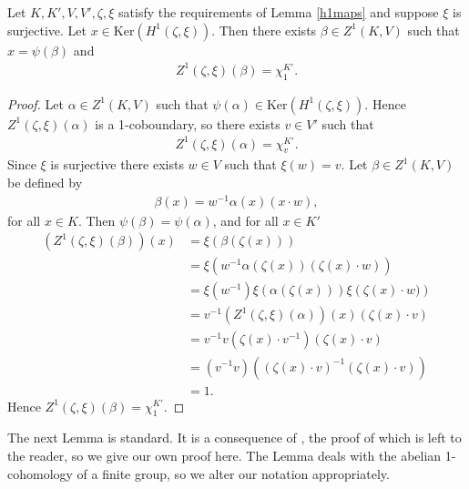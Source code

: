 \begin{lemma}\label{kerh1} Let $K, K', V, V', \zeta, \xi$ satisfy the requirements of Lemma \ref{h1maps} and suppose $\xi$ is surjective. 
Let $x\in \mathrm{Ker}\left(H^1(\zeta, \xi)\right)$. Then there exists $\beta \in Z^1(K, V)$ such that $x = \psi(\beta)$ and
\begin{align*}
	Z^1(\zeta, \xi)(\beta) = \chi^{K'}_1.
\end{align*}
\end{lemma}
\begin{proof}
	Let $\alpha \in Z^1(K, V)$ such that $\psi(\alpha) \in \mathrm{Ker}\left(H^1(\zeta, \xi)\right)$. Hence $Z^1(\zeta, \xi)(\alpha)$ is a 1-coboundary, so there exists $v \in V'$ such that
\begin{align*}
	Z^1(\zeta, \xi)(\alpha) = \chi^{K'}_v.
\end{align*}
Since $\xi$ is surjective there exists $w \in V$ such that $\xi(w) = v$.
Let $\beta \in Z^1(K, V)$ be defined by
\begin{align*}
	\beta(x) = w^{-1}\alpha(x)(x \cdot w),
\end{align*}
for all $x \in K$. Then $\psi(\beta) = \psi(\alpha)$, and for all $x \in K'$
\begin{align*}
	\left(Z^1(\zeta, \xi)(\beta)\right)(x) &= \xi\left(\beta(\zeta(x))\right) \\
		&= \xi\left(w^{-1}\alpha(\zeta(x))(\zeta(x)\cdot w )\right) \\
		&= \xi\left(w^{-1}\right)\xi\left(\alpha(\zeta(x))\right)\xi\left(\zeta(x)\cdot w )\right) \\
		&= v^{-1} \left(Z^1(\zeta, \xi)(\alpha)\right)(x) (\zeta(x) \cdot v ) \\
		&= v^{-1} v(\zeta(x) \cdot v^{-1}) (\zeta(x) \cdot v ) \\
		&= (v^{-1} v) \left((\zeta(x) \cdot v)^{-1} (\zeta(x) \cdot v )\right) \\
		&= 1.
\end{align*}
	Hence $Z^1(\zeta, \xi)(\beta) = \chi^{K'}_1$.
\end{proof}

The next Lemma is standard. It is a consequence of \cite[III.9.5(ii)]{brown1976cohomology}, the proof of which is left to the reader, so we give our own proof here. The Lemma deals with the abelian 1-cohomology of a finite group, so we alter our notation appropriately.

